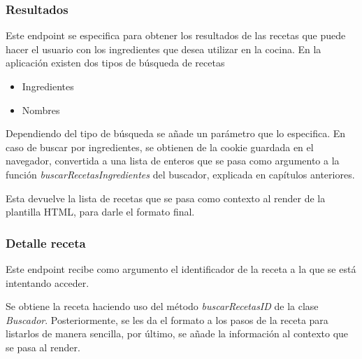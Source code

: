 \subsubsection{Resultados}
Este \gls{endpoint} se especifica para obtener los resultados de las recetas que puede hacer el usuario con los ingredientes que desea utilizar en la cocina. En la aplicación existen dos tipos de búsqueda de recetas
\begin{itemize}
    \item Ingredientes
    \item Nombres
\end{itemize}

Dependiendo del tipo de búsqueda se añade un parámetro que lo especifica. En caso de buscar por ingredientes, se obtienen de la \gls{cookie} guardada en el navegador, convertida a una lista de enteros que se pasa como argumento a la función \textit{buscarRecetasIngredientes} del buscador, explicada en capítulos anteriores.

Esta devuelve la lista de recetas que se pasa como contexto al \gls{render} de la plantilla \gls{HTML}, para darle el formato final. 

\subsubsection{Detalle receta}
Este \gls{endpoint} recibe como argumento el identificador de la receta a la que se está intentando acceder. 

Se obtiene la receta haciendo uso del método \emph{buscarRecetasID} de la clase \emph{Buscador}. Posteriormente, se les da el formato a los pasos de la receta para listarlos de manera sencilla, por último, se añade la información al contexto que se pasa al \gls{render}.